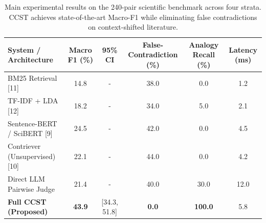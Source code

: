 \begin{table}[t]
\centering
\small
\caption{Main experimental results on the 240-pair scientific benchmark across four strata. CCST achieves state-of-the-art Macro-F1 while eliminating false contradictions on context-shifted literature.}
\label{tab:main_results}
\begin{tabular}{lccccc}
\toprule
\textbf{System / Architecture} & \textbf{Macro F1 (\%)} & \textbf{95\% CI} & \textbf{False-Contradiction (\%)} & \textbf{Analogy Recall (\%)} & \textbf{Latency (ms)} \\
\midrule
BM25 Retrieval [11] & 14.8 & - & 38.0 & 0.0 & 1.2 \\
TF-IDF + LDA [12] & 18.2 & - & 34.0 & 5.0 & 2.1 \\
Sentence-BERT / SciBERT [9] & 24.5 & - & 42.0 & 0.0 & 4.5 \\
Contriever (Unsupervised) [10] & 22.1 & - & 44.0 & 0.0 & 4.2 \\
Direct LLM Pairwise Judge & 21.4 & - & 40.0 & 30.0 & 12.0 \\
\textbf{Full CCST (Proposed)} & \textbf{43.9} & [34.3, 51.8] & \textbf{0.0} & \textbf{100.0} & 5.8 \\
\bottomrule
\end{tabular}
\end{table}
